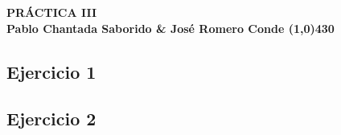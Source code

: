 \documentclass{article}
\begin{document}
\begin{center}
    \LARGE\bfseries PRÁCTICA III\\
    \small Pablo Chantada Saborido \& José Romero Conde
    \line(1,0){430}
\end{center}


\subsection*{Ejercicio 1}
\subsection*{Ejercicio 2}
\end{document}
